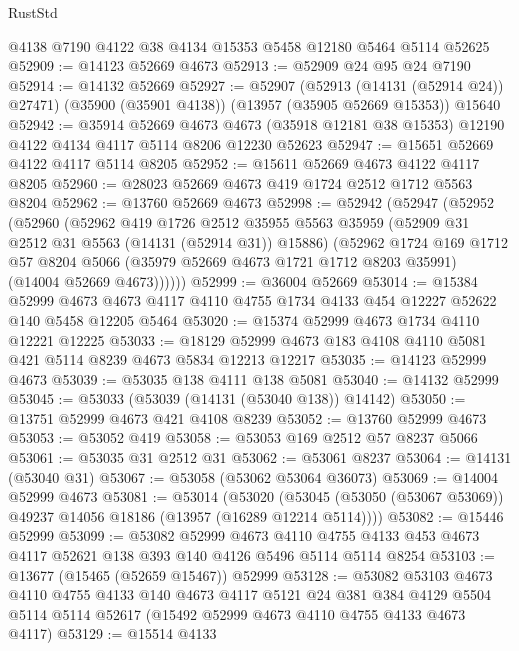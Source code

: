 \begin{lexlean}{RustStd}
\begin{coremodule}
    @4138
    @7190
    @4122
    @38
    @4134
    @15353
    @5458
    @12180
    @5464
    @5114
    @52625
@52909 := @14123 @52669 @4673
@52913 := @52909 @24 @95 @24 @7190
@52914 := @14132 @52669
@52927 := @52907
    (@52913 (@14131 (@52914 @24)) @27471)
    (@35900 (@35901 @4138))
    (@13957 (@35905 @52669 @15353))
    @15640
@52942 := @35914
    @52669
    @4673
    @4673
    (@35918 @12181 @38 @15353)
    @12190
    @4122
    @4134
    @4117
    @5114
    @8206
    @12230
    @52623
@52947 := @15651 @52669 @4122 @4117 @5114 @8205
@52952 := @15611 @52669 @4673 @4122 @4117 @8205
@52960 := @28023 @52669 @4673 @419 @1724 @2512 @1712 @5563 @8204
@52962 := @13760 @52669 @4673
@52998 := @52942
    (@52947
      (@52952
        (@52960
          (@52962
            @419
            @1726
            @2512
            @35955
            @5563
            @35959
            (@52909 @31 @2512 @31 @5563 (@14131 (@52914 @31)) @15886)
            (@52962
              @1724
              @169
              @1712
              @57
              @8204
              @5066
              (@35979 @52669 @4673 @1721 @1712 @8203 @35991)
              (@14004 @52669 @4673))))))
@52999 := @36004 @52669
@53014 := @15384
    @52999
    @4673
    @4673
    @4117
    @4110
    @4755
    @1734
    @4133
    @454
    @12227
    @52622
    @140
    @5458
    @12205
    @5464
@53020 := @15374 @52999 @4673 @1734 @4110 @12221 @12225
@53033 := @18129 @52999 @4673 @183 @4108 @4110 @5081 @421 @5114 @8239 @4673 @5834 @12213 @12217
@53035 := @14123 @52999 @4673
@53039 := @53035 @138 @4111 @138 @5081
@53040 := @14132 @52999
@53045 := @53033 (@53039 (@14131 (@53040 @138)) @14142)
@53050 := @13751 @52999 @4673 @421 @4108 @8239
@53052 := @13760 @52999 @4673
@53053 := @53052 @419
@53058 := @53053 @169 @2512 @57 @8237 @5066
@53061 := @53035 @31 @2512 @31
@53062 := @53061 @8237
@53064 := @14131 (@53040 @31)
@53067 := @53058 (@53062 @53064 @36073)
@53069 := @14004 @52999 @4673
@53081 := @53014
    (@53020 (@53045 (@53050 (@53067 @53069)) @49237 @14056 @18186 (@13957 (@16289 @12214 @5114))))
@53082 := @15446 @52999
@53099 := @53082
    @52999
    @4673
    @4110
    @4755
    @4133
    @453
    @4673
    @4117
    @52621
    @138
    @393
    @140
    @4126
    @5496
    @5114
    @5114
    @8254
@53103 := @13677 (@15465 (@52659 @15467)) @52999
@53128 := @53082
    @53103
    @4673
    @4110
    @4755
    @4133
    @140
    @4673
    @4117
    @5121
    @24
    @381
    @384
    @4129
    @5504
    @5114
    @5114
    @52617
    (@15492 @52999 @4673 @4110 @4755 @4133 @4673 @4117)
@53129 := @15514 @4133

\end{coremodule}
\end{lexlean}
